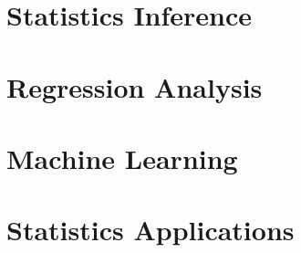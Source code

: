 \documentclass[12pt]{prettybook}
\begin{document}
\part{Statistics Inference}






\part{Regression Analysis}


\part{Machine Learning}




\part{Statistics Applications}




\appendix

\backmatter
\nocite{*}
\printbibliography
\end{document}
